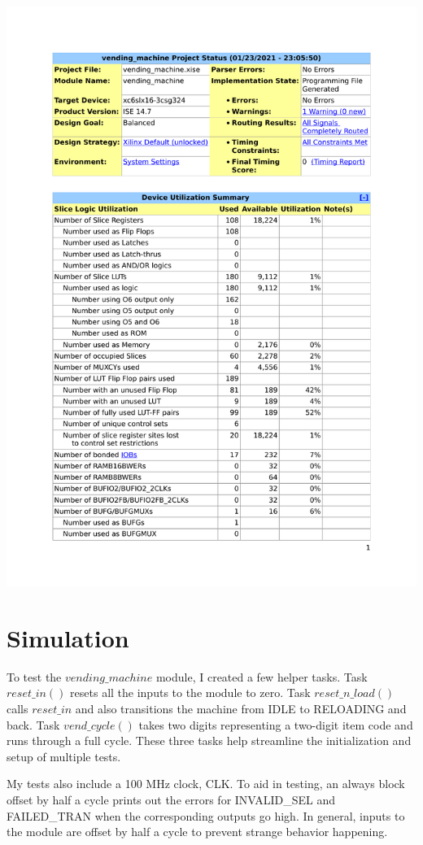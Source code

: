 \documentclass{article}
\begin{document}
{\centering\includegraphics[scale=0.8, page=3]{../figs/design_summary.pdf}\par}

\pagebreak
\section{Simulation}

To test the $vending\_machine$ module, I created a few helper tasks. Task $reset\_in()$ resets all the inputs to the module to zero. Task $reset\_n\_load()$ calls $reset\_in$ and also transitions the machine from IDLE to RELOADING and back. Task $vend\_cycle()$ takes two digits representing a two-digit item code and runs through a full cycle. These three tasks help streamline the initialization and setup of multiple tests.

My tests also include a 100 MHz clock, CLK. To aid in testing, an always block offset by half a cycle prints out the errors for INVALID\_SEL and FAILED\_TRAN when the corresponding outputs go high. In general, inputs to the module are offset by half a cycle to prevent strange behavior happening.
\end{document}
